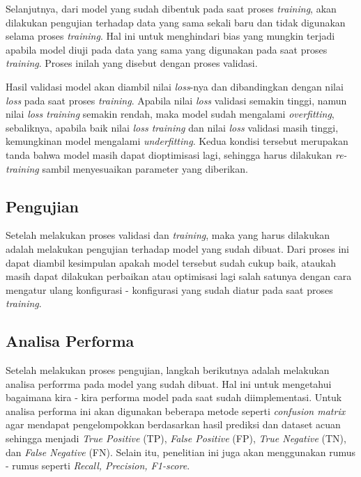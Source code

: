 Selanjutnya, dari model yang sudah dibentuk pada saat proses \textit{training}, akan dilakukan pengujian terhadap data yang sama sekali baru dan tidak digunakan selama proses \textit{training}. Hal ini untuk menghindari bias yang mungkin terjadi apabila model diuji pada data yang sama yang digunakan pada saat proses \textit{training}. Proses inilah yang disebut dengan proses validasi.

Hasil validasi model akan diambil nilai \textit{loss}-nya dan dibandingkan dengan nilai \textit{loss} pada saat proses \textit{training}. Apabila nilai \textit{loss} validasi semakin tinggi, namun nilai \textit{loss training} semakin rendah, maka model sudah mengalami \textit{overfitting}, sebaliknya, apabila baik nilai \textit{loss training} dan nilai \textit{loss} validasi masih tinggi, kemungkinan model mengalami \textit{underfitting}. Kedua kondisi tersebut merupakan tanda bahwa model masih dapat dioptimisasi lagi, sehingga harus dilakukan \textit{re-training} sambil menyesuaikan parameter yang diberikan.

\subsection{Pengujian}

Setelah melakukan proses validasi dan \textit{training}, maka yang harus dilakukan adalah melakukan pengujian terhadap model yang sudah dibuat. Dari proses ini dapat diambil kesimpulan apakah model tersebut sudah cukup baik, ataukah masih dapat dilakukan perbaikan atau optimisasi lagi salah satunya dengan cara mengatur ulang konfigurasi - konfigurasi yang sudah diatur pada saat proses \textit{training}.

\subsection{Analisa Performa}

Setelah melakukan proses pengujian, langkah berikutnya adalah melakukan analisa perforrma pada model yang sudah dibuat. Hal ini untuk mengetahui bagaimana kira - kira performa model pada saat sudah diimplementasi. Untuk analisa performa ini akan digunakan beberapa metode seperti \textit{confusion matrix} agar mendapat pengelompokkan berdasarkan hasil prediksi dan dataset acuan sehingga menjadi \textit{True Positive} (TP), \textit{False Positive} (FP), \textit{True Negative} (TN), dan \textit{False Negative} (FN). Selain itu, penelitian ini juga akan menggunakan rumus - rumus seperti \textit{Recall, Precision, F1-score}.